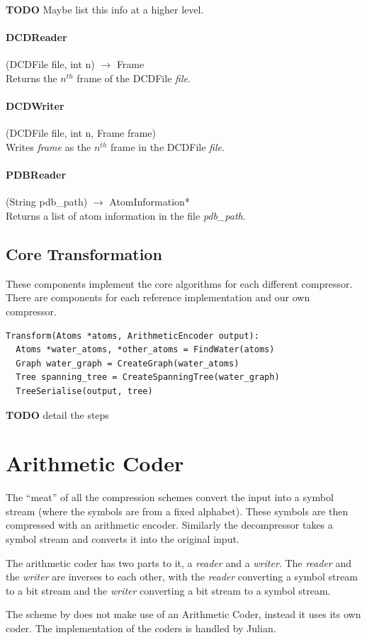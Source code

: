 \documentclass{report}
\begin{document}
\textbf{TODO} Maybe list this info at a higher level.

\paragraph{DCDReader} (DCDFile file, int n) $\to$ Frame \\
Returns the $n^{th}$ frame of the DCDFile \emph{file}.

\paragraph{DCDWriter} (DCDFile file, int n, Frame frame) \\
Writes \emph{frame} as the $n^{th}$ frame in the DCDFile \emph{file}.

\paragraph{PDBReader} (String pdb\_path) $\to$ AtomInformation* \\
Returns a list of atom information in the file \emph{pdb\_path}.


\subsection{Core Transformation}

These components implement the core algorithms for each different
compressor. There are components for each reference implementation and our own
compressor.

\begin{verbatim}
Transform(Atoms *atoms, ArithmeticEncoder output):
  Atoms *water_atoms, *other_atoms = FindWater(atoms)
  Graph water_graph = CreateGraph(water_atoms)
  Tree spanning_tree = CreateSpanningTree(water_graph)
  TreeSerialise(output, tree)
\end{verbatim}

\textbf{TODO} detail the steps

\section{Arithmetic Coder}

The ``meat'' of all the compression schemes convert the input into a symbol
stream (where the symbols are from a fixed alphabet). These symbols are then
compressed with an arithmetic encoder. Similarly the decompressor takes a
symbol stream and converts it into the original input.

The arithmetic coder has two parts to it, a \emph{reader} and a
\emph{writer}. The \emph{reader} and the \emph{writer} are inverses to each
other, with the \emph{reader} converting a symbol stream to a bit stream and
the \emph{writer} converting a bit stream to a symbol stream.

The scheme by \citet{omeltchenko2000sls} does not make use of an Arithmetic
Coder, instead it uses its own coder. The implementation of the coders is
handled by Julian.


\nocite{*}

\end{document}
